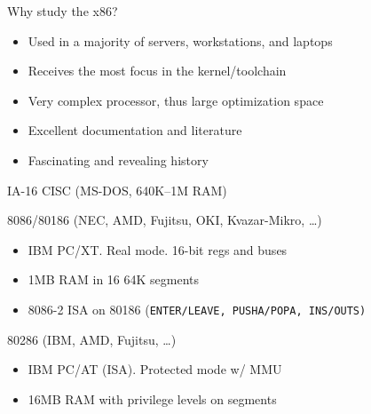 \documentclass[xcolor={dvipsnames,table}]{beamer}
\begin{document}
\begin{frame}{Why study the x86?}
\begin{itemize}
\item Used in a majority of servers, workstations, and laptops
\item Receives the most focus in the kernel/toolchain
\item Very complex processor, thus large optimization space
\item Excellent documentation and literature
\item Fascinating and revealing history
\end{itemize}
\end{frame}

\begin{frame}[t]{IA-16 CISC (MS-DOS, 640K--1M RAM)}
\begin{block}{8086/80186 (NEC, AMD, Fujitsu, OKI, Kvazar-Mikro, \ldots)}
\begin{itemize}
\item IBM PC/XT. Real mode. 16-bit regs and buses
\item 1MB RAM in 16 64K segments
\item 8086-2 ISA on 80186
{\footnotesize
(\tt{ENTER}/\tt{LEAVE}, \tt{PUSHA}/\tt{POPA}, \tt{INS}/\tt{OUTS})
}
\end{itemize}
\end{block}
\begin{block}{80286 (IBM, AMD, Fujitsu, \ldots)}
\begin{itemize}
\item IBM PC/AT (ISA). Protected mode w/ MMU
\item 16MB RAM with privilege levels on segments
\end{itemize}
\end{block}
\vfill
\begin{center}
\end{center}
\end{frame}
\end{document}
